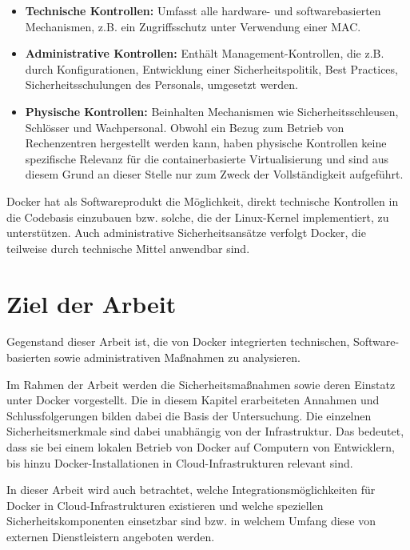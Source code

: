 \documentclass[../main.tex]{subfiles}
\begin{document}
    \begin{itemize}
      \item \textbf{Technische Kontrollen:} Umfasst alle hardware- und softwarebasierten Mechanismen, z.B. ein Zugriffsschutz unter Verwendung einer MAC.
      \item \textbf{Administrative Kontrollen:} Enthält Management-Kontrollen, die z.B. durch Konfigurationen, Entwicklung einer Sicherheitspolitik, Best Practices, Sicherheitsschulungen des Personals, umgesetzt werden.
      \item \textbf{Physische Kontrollen:} Beinhalten Mechanismen wie Sicherheitsschleusen, Schlösser und Wachpersonal. Obwohl ein Bezug zum Betrieb von Rechenzentren hergestellt werden kann, haben physische Kontrollen keine spezifische Relevanz für die containerbasierte Virtualisierung und sind aus diesem Grund an dieser Stelle nur zum Zweck der Vollständigkeit aufgeführt.
    \end{itemize}

    Docker hat als Softwareprodukt die Möglichkeit, direkt technische Kontrollen in die Codebasis einzubauen bzw. solche, die der Linux-Kernel implementiert, zu unterstützen. Auch administrative Sicherheitsansätze verfolgt Docker, die teilweise durch technische Mittel anwendbar sind.

  \section{Ziel der Arbeit}
    Gegenstand dieser Arbeit ist, die von Docker integrierten technischen, Software-basierten sowie administrativen Maßnahmen zu analysieren.

    Im Rahmen der Arbeit werden die Sicherheitsmaßnahmen sowie deren Einstatz unter Docker vorgestellt. Die in diesem Kapitel erarbeiteten Annahmen und Schlussfolgerungen bilden dabei die Basis der Untersuchung. Die einzelnen Sicherheitsmerkmale sind dabei unabhängig von der Infrastruktur. Das bedeutet, dass sie bei einem lokalen Betrieb von Docker auf Computern von Entwicklern, bis hinzu Docker-Installationen in Cloud-Infrastrukturen relevant sind.

    In dieser Arbeit wird auch betrachtet, welche Integrationsmöglichkeiten für Docker in Cloud-Infrastrukturen existieren und welche speziellen Sicherheitskomponenten einsetzbar sind bzw. in welchem Umfang diese von externen Dienstleistern angeboten werden.

\end{document}
